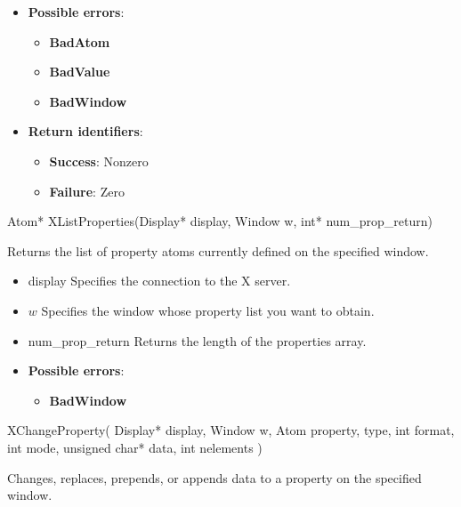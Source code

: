 \documentclass{report}
\begin{document}
\begin{itemize}
            \begin{itemize}
                \item \textbf{Possible errors}:
                    \begin{itemize}
                        \item \textbf{BadAtom}
                        \item \textbf{BadValue}
                        \item \textbf{BadWindow}
                    \end{itemize}
                \item \textbf{Return identifiers}:
                    \begin{itemize}
                        \item \textbf{Success}: Nonzero
                        \item \textbf{Failure}: Zero
                    \end{itemize}
            \end{itemize}

            \begin{cppcode}
            Atom* XListProperties(Display* display, Window w, int* num_prop_return)
            \end{cppcode}
            \bigbreak \noindent
            Returns the list of property atoms currently defined on the specified window.

            \begin{itemize}
                \item display Specifies the connection to the X server.
                \item $w$ Specifies the window whose property list you want to obtain.
                \item num\_prop\_return Returns the length of the properties array.
            \end{itemize}

            \begin{itemize}
                \item \textbf{Possible errors}:
                    \begin{itemize}
                        \item \textbf{BadWindow}
                    \end{itemize}
            \end{itemize}

            \begin{cppcode}
            XChangeProperty(
                Display* display,
                Window w,
                Atom property, type,
                int format,
                int mode,
                unsigned char* data,
                int nelements
            )
            \end{cppcode}
            \bigbreak \noindent
            Changes, replaces, prepends, or appends data to a property on the specified window.


\end{itemize}
\end{document}
